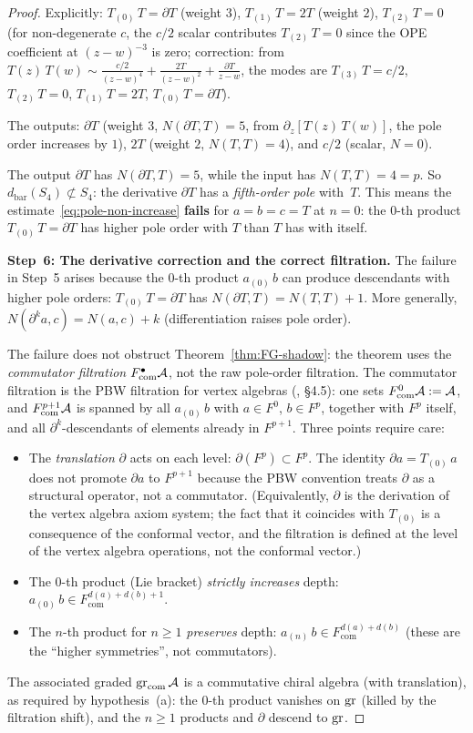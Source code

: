 \begin{proof}
Explicitly:
$T_{(0)}\,T=\partial T$ (weight $3$),
$T_{(1)}\,T=2T$ (weight $2$),
$T_{(2)}\,T=0$ (for non-degenerate $c$, the $c/2$ scalar contributes
$T_{(2)}\,T=0$ since the OPE coefficient at $(z{-}w)^{-3}$ is zero;
correction: from $T(z)\,T(w)\sim\frac{c/2}{(z-w)^4}+\frac{2T}{(z-w)^2}
+\frac{\partial T}{z-w}$, the modes are $T_{(3)}\,T=c/2$,
$T_{(2)}\,T=0$, $T_{(1)}\,T=2T$, $T_{(0)}\,T=\partial T$).

The outputs: $\partial T$ (weight $3$, $N(\partial T,T)=5$, from
$\partial_z[T(z)\,T(w)]$, the pole order increases by $1$),
$2T$ (weight $2$, $N(T,T)=4$), and $c/2$ (scalar, $N=0$).

The output $\partial T$ has $N(\partial T,T)=5$, while the input has
$N(T,T)=4=p$. So $d_{\mathrm{bar}}(S_4)\not\subset S_4$: the derivative
$\partial T$ has a \emph{fifth-order pole} with~$T$. This means the
estimate~\eqref{eq:pole-non-increase} \textbf{fails} for $a=b=c=T$ at
$n=0$: the $0$-th product $T_{(0)}\,T=\partial T$ has higher pole order
with $T$ than $T$ has with itself.

\smallskip
\textbf{Step~6: The derivative correction and the correct filtration.}
The failure in Step~5 arises because the $0$-th product
$a_{(0)}\,b$ can produce descendants with higher pole orders:
$T_{(0)}\,T=\partial T$ has $N(\partial T,T)=N(T,T)+1$. More generally,
$N(\partial^k a,c)=N(a,c)+k$ (differentiation raises pole order).

The failure does not obstruct
Theorem~\ref{thm:FG-shadow}: the theorem
uses the \emph{commutator filtration}
$F_{\mathrm{com}}^\bullet\mathcal{A}$, not the raw pole-order filtration.
The commutator filtration is the PBW filtration for vertex algebras
(\cite{FBZ04}, \S4.5): one sets
$F^0_{\mathrm{com}}\mathcal{A} := \mathcal{A}$, and
$F^{p+1}_{\mathrm{com}}\mathcal{A}$ is spanned by all $a_{(0)}\,b$ with
$a\in F^0$, $b\in F^p$, together with $F^p$ itself, and all
$\partial^k$-descendants of elements already in $F^{p+1}$. Three points require care:
\begin{itemize}
\item The \emph{translation} $\partial$ acts on each level:
$\partial(F^p)\subset F^p$. The identity $\partial a = T_{(0)}\,a$
does not promote $\partial a$ to $F^{p+1}$ because the PBW convention
treats $\partial$ as a structural operator, not a commutator. (Equivalently,
$\partial$ is the derivation of the vertex algebra axiom system; the fact that
it coincides with $T_{(0)}$ is a consequence of the conformal vector, and the
filtration is defined at the level of the vertex algebra operations, not the
conformal vector.)
\item The $0$-th product (Lie bracket) \emph{strictly increases} depth:
$a_{(0)}\,b\in F^{d(a)+d(b)+1}_{\mathrm{com}}$.
\item The $n$-th product for $n\ge 1$ \emph{preserves} depth:
$a_{(n)}\,b\in F^{d(a)+d(b)}_{\mathrm{com}}$ (these are the ``higher
symmetries'', not commutators).
\end{itemize}
The associated graded $\operatorname{gr}_{\mathrm{com}}\mathcal{A}$ is a commutative chiral
algebra (with translation), as required by hypothesis~(a): the $0$-th product
vanishes on $\operatorname{gr}$ (killed by the filtration shift), and the $n\ge 1$ products
and $\partial$ descend to $\operatorname{gr}$.


\end{proof}
